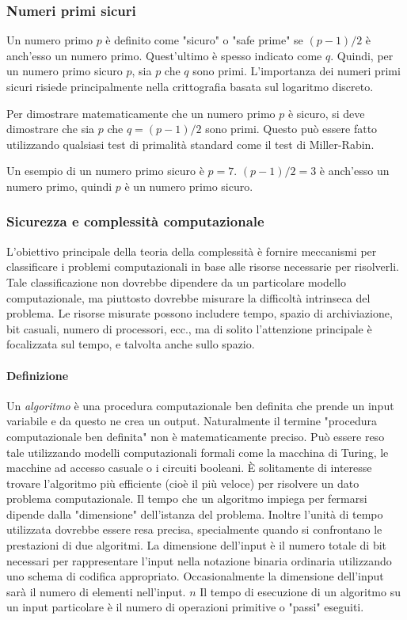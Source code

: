 \documentclass{article}
\theoremstyle{definition}
\begin{document}
\subsubsection{Numeri primi sicuri}
Un numero primo \( p \) è definito come "sicuro" o "safe prime" se \((p-1)/2\) è anch'esso un numero primo. Quest'ultimo è spesso indicato come \( q \). Quindi, per un numero primo sicuro \( p \), sia \( p \) che \( q \) sono primi. L'importanza dei numeri primi sicuri risiede principalmente nella crittografia basata sul logaritmo discreto. 

Per dimostrare matematicamente che un numero primo \( p \) è sicuro, si deve dimostrare che sia \( p \) che \( q = (p-1)/2 \) sono primi. Questo può essere fatto utilizzando qualsiasi test di primalità standard come il test di Miller-Rabin.

Un esempio di un numero primo sicuro è \( p = 7 \). \( (p-1)/2 = 3 \) è anch'esso un numero primo, quindi \( p \) è un numero primo sicuro.

\subsubsection{Sicurezza e complessità computazionale}
L'obiettivo principale della teoria della complessità è fornire meccanismi per classificare i problemi computazionali in base alle risorse necessarie per risolverli. Tale classificazione non dovrebbe dipendere da un particolare modello computazionale, ma piuttosto dovrebbe misurare la difficoltà intrinseca del problema. Le risorse misurate possono includere tempo, spazio di archiviazione, bit casuali, numero di processori, ecc., ma di solito l'attenzione principale è focalizzata sul tempo, e talvolta anche sullo spazio.

\paragraph{Definizione}
Un \textit{algoritmo} è una procedura computazionale ben definita che prende un input variabile e da questo ne crea un output. Naturalmente il termine "procedura computazionale ben definita" non è matematicamente preciso. Può essere reso tale utilizzando modelli computazionali formali come la macchina di Turing, le macchine ad accesso casuale o i circuiti booleani. 
È solitamente di interesse trovare l'algoritmo più efficiente (cioè il più veloce) per risolvere un dato problema computazionale. Il tempo che un algoritmo impiega per fermarsi dipende dalla "dimensione" dell'istanza del problema. Inoltre l'unità di tempo utilizzata dovrebbe essere resa precisa, specialmente quando si confrontano le prestazioni di due algoritmi. La dimensione dell'input è il numero totale di bit necessari per rappresentare l'input nella notazione binaria ordinaria utilizzando uno schema di codifica appropriato. Occasionalmente la dimensione dell'input sarà il numero di elementi nell'input. $n$ Il tempo di esecuzione di un algoritmo su un input particolare è il numero di operazioni primitive o "passi" eseguiti.
\end{document}
